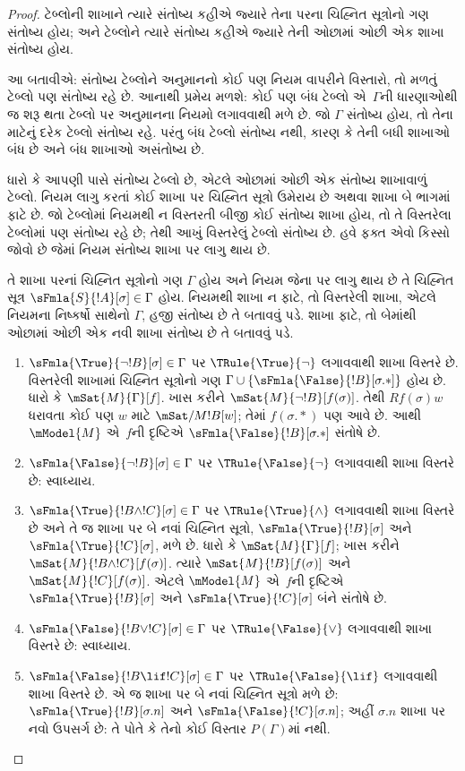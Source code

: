 \begin{proof}
ટેબ્લોની શાખાને ત્યારે સંતોષ્ય કહીએ જ્યારે
તેના પરના ચિહ્નિત સૂત્રોનો ગણ સંતોષ્ય હોય;
અને ટેબ્લોને ત્યારે સંતોષ્ય કહીએ જ્યારે
તેની ઓછામાં ઓછી એક શાખા સંતોષ્ય હોય.

આ બતાવીએ: સંતોષ્ય ટેબ્લોને અનુમાનનો કોઈ પણ
નિયમ વાપરીને વિસ્તારો, તો મળતું ટેબ્લો પણ
સંતોષ્ય રહે છે. આનાથી પ્રમેય મળશે: કોઈ પણ બંધ
ટેબ્લો એ~$\Gamma$ની ધારણાઓથી જ શરૂ થતા
ટેબ્લો પર અનુમાનના નિયમો લગાવવાથી મળે છે.
જો $\Gamma$ સંતોષ્ય હોય, તો તેના માટેનું દરેક
ટેબ્લો સંતોષ્ય રહે. પરંતુ બંધ ટેબ્લો
સંતોષ્ય નથી, કારણ કે તેની બધી શાખાઓ બંધ છે
અને બંધ શાખાઓ અસંતોષ્ય છે.

ધારો કે આપણી પાસે સંતોષ્ય ટેબ્લો છે,
એટલે ઓછામાં ઓછી એક સંતોષ્ય શાખાવાળું
ટેબ્લો. નિયમ લાગુ કરતાં કોઈ શાખા પર
ચિહ્નિત સૂત્રો ઉમેરાય છે અથવા શાખા
બે ભાગમાં ફાટે છે. જો ટેબ્લોમાં નિયમથી ન વિસ્તરતી
બીજી કોઈ સંતોષ્ય શાખા હોય, તો તે વિસ્તરેલા
ટેબ્લોમાં પણ સંતોષ્ય રહે છે; તેથી આખું
વિસ્તરેલું ટેબ્લો સંતોષ્ય છે. હવે ફક્ત એવો
કિસ્સો જોવો છે જેમાં નિયમ સંતોષ્ય શાખા પર
લાગુ થાય છે.

તે શાખા પરનાં ચિહ્નિત સૂત્રોનો ગણ
$\Gamma$ હોય અને નિયમ જેના પર લાગુ થાય છે તે
ચિહ્નિત સૂત્ર $\sFmla{S}{!A}[\sigma] \in \Gamma$
હોય. નિયમથી શાખા ન ફાટે, તો વિસ્તરેલી શાખા,
એટલે નિયમના નિષ્કર્ષો સાથેનો $\Gamma$,
હજી સંતોષ્ય છે તે બતાવવું પડે. શાખા ફાટે,
તો બેમાંથી ઓછામાં ઓછી એક નવી શાખા સંતોષ્ય
છે તે બતાવવું પડે.
\begin{enumerate}
\item $\sFmla{\True}{\lnot !B}[\sigma] \in \Gamma$
  પર $\TRule{\True}{\lnot}$ લગાવવાથી શાખા
  વિસ્તરે છે. વિસ્તરેલી શાખામાં
  ચિહ્નિત સૂત્રોનો ગણ $\Gamma \cup
  \{\sFmla{\False}{!B}[\sigma.{*}]\}$ હોય છે.
  ધારો કે $\mSat{M}{\Gamma}[f]$. ખાસ કરીને
  $\mSat{M}{\lnot !B}[f(\sigma)]$. તેથી
  $Rf(\sigma)w$ ધરાવતા કોઈ પણ $w$ માટે
  $\mSat/{M}{!B}[w]$; તેમાં $f(\sigma.{*})$
  પણ આવે છે. આથી $\mModel{M}$ એ~$f$ની
  દૃષ્ટિએ $\sFmla{\False}{!B}[\sigma.{*}]$
  સંતોષે છે.
\item $\sFmla{\False}{\lnot !B}[\sigma] \in \Gamma$
  પર $\TRule{\False}{\lnot}$ લગાવવાથી શાખા
  વિસ્તરે છે: સ્વાધ્યાય.
\item $\sFmla{\True}{!B \land !C}[\sigma] \in \Gamma$
  પર $\TRule{\True}{\land}$ લગાવવાથી શાખા
  વિસ્તરે છે અને તે જ શાખા પર બે નવાં
  ચિહ્નિત સૂત્રો, $\sFmla{\True}{!B}[\sigma]$
  અને $\sFmla{\True}{!C}[\sigma]$, મળે છે.
  ધારો કે $\mSat{M}{\Gamma}[f]$; ખાસ કરીને
  $\mSat{M}{!B \land !C}[f(\sigma)]$.
  ત્યારે $\mSat{M}{!B}[f(\sigma)]$ અને
  $\mSat{M}{!C}[f(\sigma)]$. એટલે
  $\mModel{M}$ એ~$f$ની દૃષ્ટિએ
  $\sFmla{\True}{!B}[\sigma]$ અને
  $\sFmla{\True}{!C}[\sigma]$ બંને સંતોષે છે.
\item $\sFmla{\False}{!B \lor !C}[\sigma] \in \Gamma$
  પર $\TRule{\False}{\lor}$ લગાવવાથી શાખા
  વિસ્તરે છે: સ્વાધ્યાય.
\item $\sFmla{\False}{!B \lif !C}[\sigma] \in \Gamma$
  પર $\TRule{\False}{\lif}$ લગાવવાથી શાખા
  વિસ્તરે છે. એ જ શાખા પર બે નવાં
  ચિહ્નિત સૂત્રો મળે છે:
  $\sFmla{\True}{!B}[\sigma.n]$ અને
  $\sFmla{\False}{!C}[\sigma.n]$; અહીં
  $\sigma.n$ શાખા પર નવો ઉપસર્ગ છે: તે પોતે કે
  તેનો કોઈ વિસ્તાર $P(\Gamma)$માં નથી.


\end{enumerate}
\end{proof}
